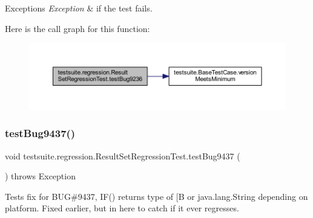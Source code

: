 \begin{DoxyExceptions}{Exceptions}
{\em Exception} & if the test fails. \\
\hline
\end{DoxyExceptions}
Here is the call graph for this function\+:
\nopagebreak
\begin{figure}[H]
\begin{center}
\leavevmode
\includegraphics[width=350pt]{classtestsuite_1_1regression_1_1_result_set_regression_test_ad29ed5c9d0749bc7bbdcbbacd1b45910_cgraph}
\end{center}
\end{figure}
\mbox{\label{classtestsuite_1_1regression_1_1_result_set_regression_test_aa1115212e57fbb7e7c76c150db7d5ff5}} 
\subsubsection{\texorpdfstring{test\+Bug9437()}{testBug9437()}}
{\footnotesize\ttfamily void testsuite.\+regression.\+Result\+Set\+Regression\+Test.\+test\+Bug9437 (\begin{DoxyParamCaption}{ }\end{DoxyParamCaption}) throws Exception}

Tests fix for B\+UG\#9437, I\+F() returns type of \mbox{[}B or java.\+lang.\+String depending on platform. Fixed earlier, but in here to catch if it ever regresses.


